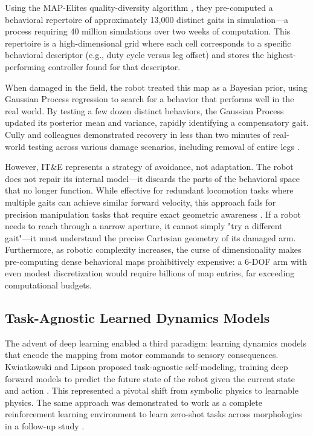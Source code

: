 \documentclass[12pt,a4paper,oneside]{report}
\begin{document}
Using the MAP-Elites quality-diversity algorithm \cite{mouret2015illuminating}, they pre-computed a behavioral repertoire of approximately 13,000 distinct gaits in simulation—a process requiring 40 million simulations over two weeks of computation. This repertoire is a high-dimensional grid where each cell corresponds to a specific behavioral descriptor (e.g., duty cycle versus leg offset) and stores the highest-performing controller found for that descriptor.

When damaged in the field, the robot treated this map as a Bayesian prior, using Gaussian Process regression to search for a behavior that performs well in the real world. By testing a few dozen distinct behaviors, the Gaussian Process updated its posterior mean and variance, rapidly identifying a compensatory gait. Cully and colleagues demonstrated recovery in less than two minutes of real-world testing across various damage scenarios, including removal of entire legs \cite{cully2015robots}.

However, IT\&E represents a strategy of avoidance, not adaptation. The robot does not repair its internal model—it discards the parts of the behavioral space that no longer function. While effective for redundant locomotion tasks where multiple gaits can achieve similar forward velocity, this approach fails for precision manipulation tasks that require exact geometric awareness \cite{kwiatkowski2019task}. If a robot needs to reach through a narrow aperture, it cannot simply "try a different gait"—it must understand the precise Cartesian geometry of its damaged arm. Furthermore, as robotic complexity increases, the curse of dimensionality makes pre-computing dense behavioral maps prohibitively expensive: a 6-DOF arm with even modest discretization would require billions of map entries, far exceeding computational budgets.

\subsection{Task-Agnostic Learned Dynamics Models}

The advent of deep learning enabled a third paradigm: learning dynamics models that encode the mapping from motor commands to sensory consequences. Kwiatkowski and Lipson proposed task-agnostic self-modeling, training deep forward models to predict the future state of the robot given the current state and action \cite{kwiatkowski2019task}. This represented a pivotal shift from symbolic physics to learnable physics. The same approach was demonstrated to work as a complete reinforcement learning environment to learn zero-shot tasks across morphologies in a follow-up study \cite{kwiatkowski2019zeroshot}.
\end{document}
